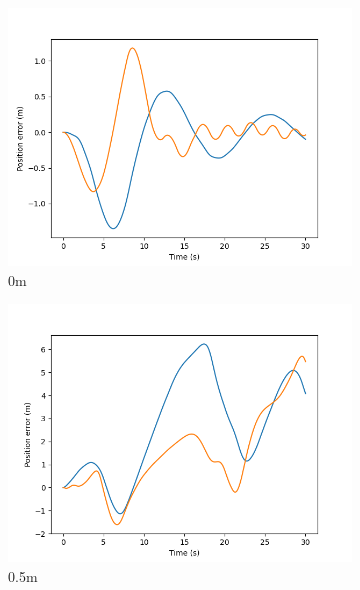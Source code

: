 \documentclass[class=article, crop=false]{standalone}
\begin{document}
\begin{figure}
    \centering
    \begin{subfigure}[b]{0.48\textwidth}
        \centering
        \includegraphics{scenario1/rov-50m/0.0m/usv_pos_error_controlled}
        \caption{0m}
        \label{}
    \end{subfigure}
    \hfill
        \begin{subfigure}[b]{0.48\textwidth}
        \centering
        \includegraphics{scenario1/rov-50m/0.5m/usv_pos_error_controlled}
        \caption{0.5m}
        \label{}
    \end{subfigure}
    \vfill
        \begin{subfigure}[b]{0.48\textwidth}
        \centering

\end{subfigure}
\end{figure}
\end{document}
